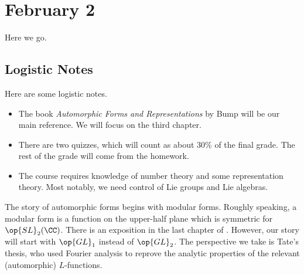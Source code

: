 \documentclass[../notes.tex]{subfiles}
\begin{document}
\section{February 2}
Here we go.

\subsection{Logistic Notes}
Here are some logistic notes.
\begin{itemize}
	\item The book \textit{Automorphic Forms and Representations} by Bump \cite{bump-forms} will be our main reference. We will focus on the third chapter.
	\item There are two quizzes, which will count as about 30\% of the final grade. The rest of the grade will come from the homework.
	\item The course requires knowledge of number theory and some representation theory. Most notably, we need control of Lie groups and Lie algebras.
\end{itemize}
The story of automorphic forms begins with modular forms. Roughly speaking, a modular form is a function on the upper-half plane which is symmetric for $\op{SL}_2(\CC)$. There is an exposition in the last chapter of \cite{course-arithmetic}. However, our story will start with $\op{GL}_1$ instead of $\op{GL}_2$. The perspective we take is Tate's thesis, who used Fourier analysis to reprove the analytic properties of the relevant (automorphic) $L$-functions.
\end{document}
